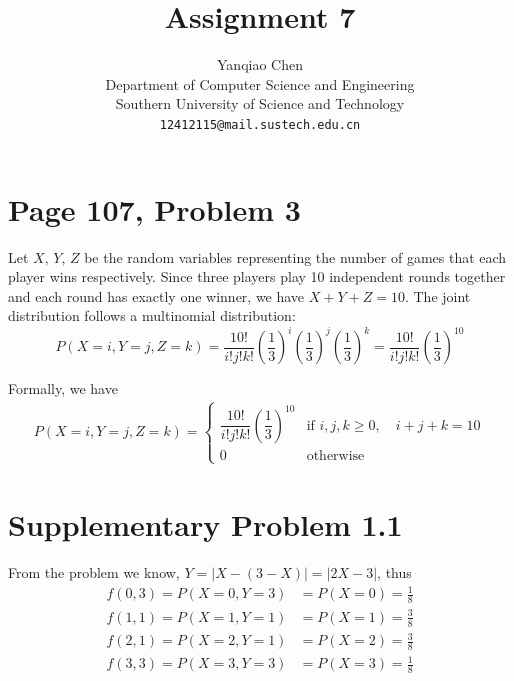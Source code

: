 \documentclass[a4paper, UTF-8]{article}
\theoremstyle{plain}
\begin{document}
\title{Assignment 7}

\author{Yanqiao Chen\\ 
  Department of Computer Science and Engineering\\
  Southern University of Science and Technology\\
  \texttt{12412115@mail.sustech.edu.cn}
  }


\maketitle

\section{Page 107, Problem 3}

Let $X$, $Y$, $Z$ be the random variables representing the number of games that each player
wins respectively. Since three players play 10 independent rounds together and each round has exactly one winner, we have $X + Y + Z = 10$. The joint distribution follows a multinomial distribution:
$$
P(X = i, Y = j, Z = k) = \frac{10!}{i!j!k!} \left(\frac{1}{3}\right)^{i} \left(\frac{1}{3}\right)^{j} \left(\frac{1}{3}\right)^{k} = \frac{10!}{i!j!k!} \left(\frac{1}{3}\right)^{10}
$$

Formally, we have
\begin{align*}
P(X = i, Y = j, Z = k) = \begin{cases}
\dfrac{10!}{i!j!k!} \left(\dfrac{1}{3}\right)^{10} & \text{if } i, j, k \geq 0, \quad i + j + k = 10\\[8pt]
0 & \text{otherwise}
\end{cases}
\end{align*}

\section{Supplementary Problem 1.1}

From the problem we know, $Y = |X - (3 - X)| = |2X - 3|$, thus 
\begin{align*} 
f(0,3) = P(X = 0, Y = 3) &= P(X = 0) = \frac{1}{8}\\
f(1,1) = P(X = 1, Y = 1) &= P(X = 1) = \frac{3}{8}\\
f(2,1) = P(X = 2, Y = 1) &= P(X = 2) = \frac{3}{8}\\
f(3,3) = P(X = 3, Y = 3) &= P(X = 3) = \frac{1}{8}
\end{align*}
\end{document}
